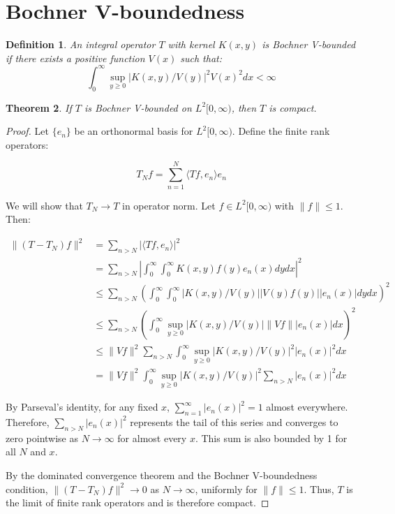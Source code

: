 \documentclass{article}
\newtheorem{theorem}{Theorem}
\newtheorem{definition}[theorem]{Definition}
\begin{document}
\section{Bochner V-boundedness}

\begin{definition}
An integral operator $T$ with kernel $K(x,y)$ is Bochner V-bounded if there exists a positive function $V(x)$ such that:
\[\int_0^\infty \sup_{y\geq0} |K(x,y)/V(y)|^2 V(x)^2 dx < \infty\]
\end{definition}

\begin{theorem}
If $T$ is Bochner V-bounded on $L^2[0,\infty)$, then $T$ is compact.
\end{theorem}

\begin{proof}
Let $\{e_n\}$ be an orthonormal basis for $L^2[0,\infty)$. Define the finite rank operators:

\[T_N f = \sum_{n=1}^N \langle Tf, e_n \rangle e_n\]

We will show that $T_N \to T$ in operator norm. Let $f \in L^2[0,\infty)$ with $\|f\| \leq 1$. Then:

\begin{align*}
\|(T-T_N)f\|^2 &= \sum_{n>N} |\langle Tf, e_n \rangle|^2 \\
&= \sum_{n>N} \left|\int_0^\infty \int_0^\infty K(x,y)f(y)e_n(x) dy dx\right|^2 \\
&\leq \sum_{n>N} \left(\int_0^\infty \int_0^\infty |K(x,y)/V(y)| |V(y)f(y)| |e_n(x)| dy dx\right)^2 \\
&\leq \sum_{n>N} \left(\int_0^\infty \sup_{y\geq0} |K(x,y)/V(y)| \|V f\| |e_n(x)| dx\right)^2 \\
&\leq \|V f\|^2 \sum_{n>N} \int_0^\infty \sup_{y\geq0} |K(x,y)/V(y)|^2 |e_n(x)|^2 dx \\
&= \|V f\|^2 \int_0^\infty \sup_{y\geq0} |K(x,y)/V(y)|^2 \sum_{n>N} |e_n(x)|^2 dx
\end{align*}

By Parseval's identity, for any fixed $x$, $\sum_{n=1}^\infty |e_n(x)|^2 = 1$ almost everywhere. Therefore, $\sum_{n>N} |e_n(x)|^2$ represents the tail of this series and converges to zero pointwise as $N \to \infty$ for almost every $x$. This sum is also bounded by 1 for all $N$ and $x$.

By the dominated convergence theorem and the Bochner V-boundedness condition, $\|(T-T_N)f\|^2 \to 0$ as $N \to \infty$, uniformly for $\|f\| \leq 1$. Thus, $T$ is the limit of finite rank operators and is therefore compact.
\end{proof}
\end{document}
